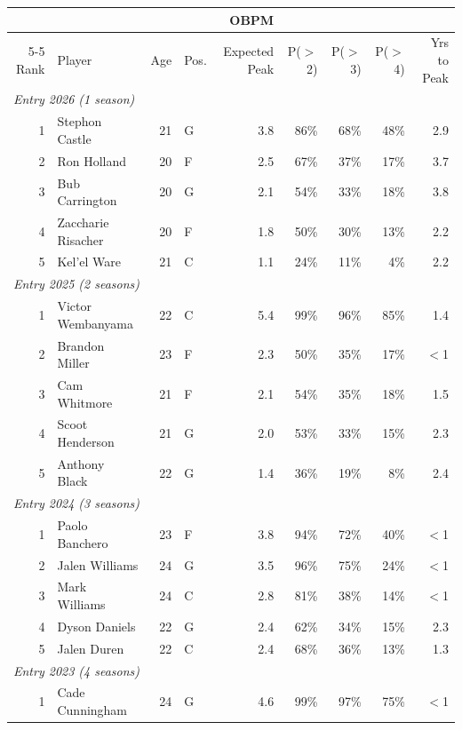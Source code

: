 \begin{table}[htbp]
  \centering\small
  \begin{tabular}{rlrlrrrrr}
    \toprule
     & & & & OBPM & & & & \\
    \cmidrule(lr){5-5}
    Rank & Player & Age & Pos. & Expected Peak & P($>$2) & P($>$3) & P($>$4) & Yrs to Peak \\
    \midrule
    \multicolumn{9}{l}{\textit{Entry 2026 (1 season)}} \\
    \midrule
    1 & Stephon Castle & 21 & G & 3.8 & 86\% & 68\% & 48\% & 2.9 \\
    2 & Ron Holland & 20 & F & 2.5 & 67\% & 37\% & 17\% & 3.7 \\
    3 & Bub Carrington & 20 & G & 2.1 & 54\% & 33\% & 18\% & 3.8 \\
    4 & Zaccharie Risacher & 20 & F & 1.8 & 50\% & 30\% & 13\% & 2.2 \\
    5 & Kel'el Ware & 21 & C & 1.1 & 24\% & 11\% & 4\% & 2.2 \\
    \midrule[0.4pt]
    \multicolumn{9}{l}{\textit{Entry 2025 (2 seasons)}} \\
    \midrule
    1 & Victor Wembanyama & 22 & C & 5.4 & 99\% & 96\% & 85\% & 1.4 \\
    2 & Brandon Miller & 23 & F & 2.3 & 50\% & 35\% & 17\% & $<$1 \\
    3 & Cam Whitmore & 21 & F & 2.1 & 54\% & 35\% & 18\% & 1.5 \\
    4 & Scoot Henderson & 21 & G & 2.0 & 53\% & 33\% & 15\% & 2.3 \\
    5 & Anthony Black & 22 & G & 1.4 & 36\% & 19\% & 8\% & 2.4 \\
    \midrule[0.4pt]
    \multicolumn{9}{l}{\textit{Entry 2024 (3 seasons)}} \\
    \midrule
    1 & Paolo Banchero & 23 & F & 3.8 & 94\% & 72\% & 40\% & $<$1 \\
    2 & Jalen Williams & 24 & G & 3.5 & 96\% & 75\% & 24\% & $<$1 \\
    3 & Mark Williams & 24 & C & 2.8 & 81\% & 38\% & 14\% & $<$1 \\
    4 & Dyson Daniels & 22 & G & 2.4 & 62\% & 34\% & 15\% & 2.3 \\
    5 & Jalen Duren & 22 & C & 2.4 & 68\% & 36\% & 13\% & 1.3 \\
    \midrule[0.4pt]
    \multicolumn{9}{l}{\textit{Entry 2023 (4 seasons)}} \\
    \midrule
    1 & Cade Cunningham & 24 & G & 4.6 & 99\% & 97\% & 75\% & $<$1 \\

\end{tabular}
\end{table}
